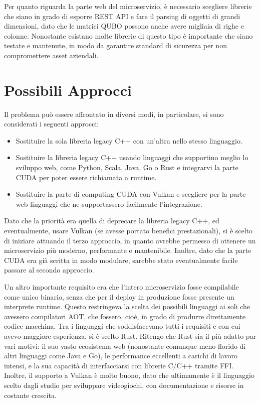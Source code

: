 Per quanto riguarda la parte web del microservizio, è necessario scegliere librerie che siano in grado di esporre REST \gls{API} e fare il parsing di oggetti di grandi dimensioni, dato che le matrici \gls{QUBO} possono anche avere migliaia di righe e colonne. Nonostante esistano molte librerie di questo tipo è importante che siano testate e mantenute, in modo da garantire standard di sicurezza per non compromettere asset aziendali.


\section{Possibili Approcci}

Il problema può essere affrontato in diversi modi, in particolare, si sono considerati i seguenti approcci:

\begin{itemize}
    \item Sostituire la sola libreria legacy C++ con un'altra nello stesso linguaggio.
    \item Sostituire la libreria legacy C++ usando linguaggi che supportino meglio lo sviluppo web, come Python, Scala, Java, Go o Rust e integrarvi la parte \gls{CUDA} per poter essere richiamata a runtime.
    \item Sostituire la parte di computing \gls{CUDA} con Vulkan e scegliere per la parte web linguaggi che ne supportassero facilmente l'integrazione.
\end{itemize}

Dato che la priorità era quella di deprecare la libreria legacy C++, ed eventualmente, usare Vulkan (se avesse portato benefici prestazionali), si è scelto di iniziare attuando il terzo approccio, in quanto avrebbe permesso di ottenere un microservizio più moderno, performante e mantenibile. Inoltre, dato che la parte \gls{CUDA} era già scritta in modo modulare, sarebbe stato eventualmente facile passare al secondo approccio.

Un altro importante requisito era che l'intero microservizio fosse compilabile come unico binario, senza che per il deploy in produzione fosse presente un interprete runtime. Questo restringeva la scelta dei possibili linguaggi ai soli che avessero compilatori \gls{AOT}, che fossero, cioè, in grado di produrre direttamente codice macchina. Tra i linguaggi che soddisfacevano tutti i requisiti e con cui avevo maggiore esperienza, si è scelto Rust. Ritengo che Rust sia il più adatto par vari motivi: il suo vasto ecosistema web (nonostante comunque meno florido di altri linguaggi come Java e Go), le performance eccellenti a carichi di lavoro intensi, e la sua capacità di interfacciarsi con librerie C/C++ tramite \gls{FFI}. Inoltre, il supporto a Vulkan è molto buono, dato che ultimamente è il linguaggio scelto dagli studio per sviluppare videogiochi, con documentazione e risorse in costante crescita.

